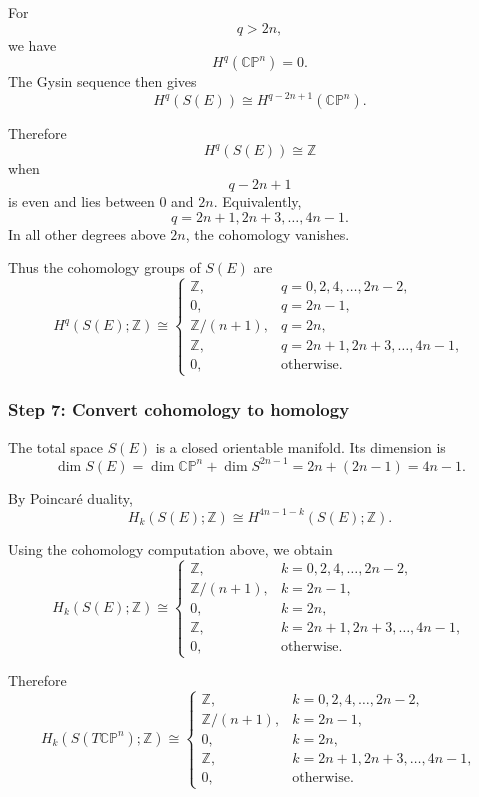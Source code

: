 \documentclass[12pt,a4paper]{article}
\theoremstyle{notespace}
\begin{document}
For
\[
q>2n,
\]
we have
\[
H^q(\mathbb{CP}^n)=0.
\]
The Gysin sequence then gives
\[
H^q(S(E))\cong H^{q-2n+1}(\mathbb{CP}^n).
\]

Therefore
\[
H^q(S(E))\cong \mathbb Z
\]
when
\[
q-2n+1
\]
is even and lies between \(0\) and \(2n\). Equivalently,
\[
q=2n+1,2n+3,\ldots,4n-1.
\]
In all other degrees above \(2n\), the cohomology vanishes.

Thus the cohomology groups of \(S(E)\) are
\[
H^q(S(E);\mathbb Z)\cong
\begin{cases}
	\mathbb Z, & q=0,2,4,\ldots,2n-2,\\[1mm]
	0, & q=2n-1,\\[1mm]
	\mathbb Z/(n+1), & q=2n,\\[1mm]
	\mathbb Z, & q=2n+1,2n+3,\ldots,4n-1,\\[1mm]
	0, & \text{otherwise}.
\end{cases}
\]

\subsubsection*{Step 7: Convert cohomology to homology}

The total space \(S(E)\) is a closed orientable manifold. Its dimension is
\[
\dim S(E)
=
\dim \mathbb{CP}^n+\dim S^{2n-1}
=
2n+(2n-1)
=
4n-1.
\]

By Poincar\'e duality,
\[
H_k(S(E);\mathbb Z)
\cong
H^{4n-1-k}(S(E);\mathbb Z).
\]

Using the cohomology computation above, we obtain
\[
H_k(S(E);\mathbb Z)\cong
\begin{cases}
	\mathbb Z, & k=0,2,4,\ldots,2n-2,\\[1mm]
	\mathbb Z/(n+1), & k=2n-1,\\[1mm]
	0, & k=2n,\\[1mm]
	\mathbb Z, & k=2n+1,2n+3,\ldots,4n-1,\\[1mm]
	0, & \text{otherwise}.
\end{cases}
\]

Therefore
\[
\boxed{
	H_k(S(T\mathbb{CP}^n);\mathbb Z)\cong
	\begin{cases}
		\mathbb Z, & k=0,2,4,\ldots,2n-2,\\[1mm]
		\mathbb Z/(n+1), & k=2n-1,\\[1mm]
		0, & k=2n,\\[1mm]
		\mathbb Z, & k=2n+1,2n+3,\ldots,4n-1,\\[1mm]
		0, & \text{otherwise}.
	\end{cases}
}
\]
\end{document}
